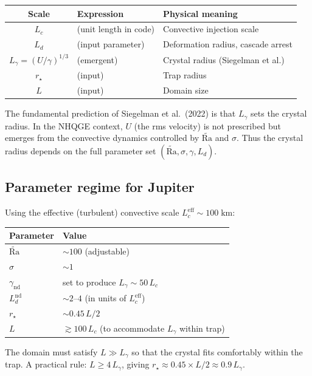 \documentclass[11pt]{article}
\newcommand{\Rav}{\widetilde{\mathrm{Ra}}}
\newcommand{\Ld}{L_d}
\newcommand{\Lc}{L_c}
\begin{document}
\begin{center}
\begin{tabular}{cll}
\toprule
Scale & Expression & Physical meaning \\
\midrule
$\Lc$ & (unit length in code) & Convective injection scale \\
$\Ld$ & (input parameter) & Deformation radius, cascade arrest \\
$L_\gamma = (U/\gamma)^{1/3}$ & (emergent) & Crystal radius (Siegelman et al.) \\
$r_\star$ & (input) & Trap radius \\
$L$ & (input) & Domain size \\
\bottomrule
\end{tabular}
\end{center}

The fundamental prediction of Siegelman et al.\ (2022) is that $L_\gamma$ sets the crystal radius. In the NHQGE context, $U$ (the rms velocity) is not prescribed but emerges from the convective dynamics controlled by $\Rav$ and $\sigma$. Thus the crystal radius depends on the full parameter set $(\Rav, \sigma, \gamma, \Ld)$.

\subsection{Parameter regime for Jupiter}

Using the effective (turbulent) convective scale $\Lc^{\mathrm{eff}} \sim 100\;\mathrm{km}$:
\begin{center}
\begin{tabular}{ll}
\toprule
Parameter & Value \\
\midrule
$\Rav$ & $\sim 100$ (adjustable) \\
$\sigma$ & $\sim 1$ \\
$\gamma_{\mathrm{nd}}$ & set to produce $L_\gamma \sim 50\,\Lc$ \\
$\Ld^{\mathrm{nd}}$ & $\sim 2$--$4$ (in units of $\Lc^{\mathrm{eff}}$)  \\
$r_\star$ & $\sim 0.45\,L/2$ \\
$L$ & $\gtrsim 100\,\Lc$ (to accommodate $L_\gamma$ within trap) \\
\bottomrule
\end{tabular}
\end{center}

The domain must satisfy $L \gg L_\gamma$ so that the crystal fits comfortably within the trap. A practical rule: $L \ge 4\,L_\gamma$, giving $r_\star \approx 0.45 \times L/2 \approx 0.9\,L_\gamma$.
\end{document}
